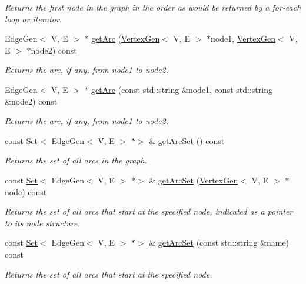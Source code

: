 \begin{DoxyCompactItemize}
\begin{DoxyCompactList}\small\item\em Returns the first node in the graph in the order as would be returned by a for-\/each loop or iterator. \end{DoxyCompactList}\item 
Edge\+Gen$<$ V, E $>$ $\ast$ \mbox{\hyperlink{classGraph_a7c33db338f839ff9e3dafe4fe61c16fd}{get\+Arc}} (\mbox{\hyperlink{classVertexGen}{Vertex\+Gen}}$<$ V, E $>$ $\ast$node1, \mbox{\hyperlink{classVertexGen}{Vertex\+Gen}}$<$ V, E $>$ $\ast$node2) const
\begin{DoxyCompactList}\small\item\em Returns the arc, if any, from node1 to node2. \end{DoxyCompactList}\item 
Edge\+Gen$<$ V, E $>$ $\ast$ \mbox{\hyperlink{classGraph_a94d4badfc856b0d4530c37121efb9834}{get\+Arc}} (const std\+::string \&node1, const std\+::string \&node2) const
\begin{DoxyCompactList}\small\item\em Returns the arc, if any, from node1 to node2. \end{DoxyCompactList}\item 
const \mbox{\hyperlink{classSet}{Set}}$<$ Edge\+Gen$<$ V, E $>$ $\ast$$>$ \& \mbox{\hyperlink{classGraph_a0690edaeae8d5256189ae2e8541788b5}{get\+Arc\+Set}} () const
\begin{DoxyCompactList}\small\item\em Returns the set of all arcs in the graph. \end{DoxyCompactList}\item 
const \mbox{\hyperlink{classSet}{Set}}$<$ Edge\+Gen$<$ V, E $>$ $\ast$$>$ \& \mbox{\hyperlink{classGraph_a17cfc7f4d8c738fc6f51813f50be6400}{get\+Arc\+Set}} (\mbox{\hyperlink{classVertexGen}{Vertex\+Gen}}$<$ V, E $>$ $\ast$node) const
\begin{DoxyCompactList}\small\item\em Returns the set of all arcs that start at the specified node, indicated as a pointer to its node structure. \end{DoxyCompactList}\item 
const \mbox{\hyperlink{classSet}{Set}}$<$ Edge\+Gen$<$ V, E $>$ $\ast$$>$ \& \mbox{\hyperlink{classGraph_a31b9e2056ee2d66a7ea9feb02f016e8d}{get\+Arc\+Set}} (const std\+::string \&name) const
\begin{DoxyCompactList}\small\item\em Returns the set of all arcs that start at the specified node. \end{DoxyCompactList}\item 
$$
\end{DoxyCompactItemize}
